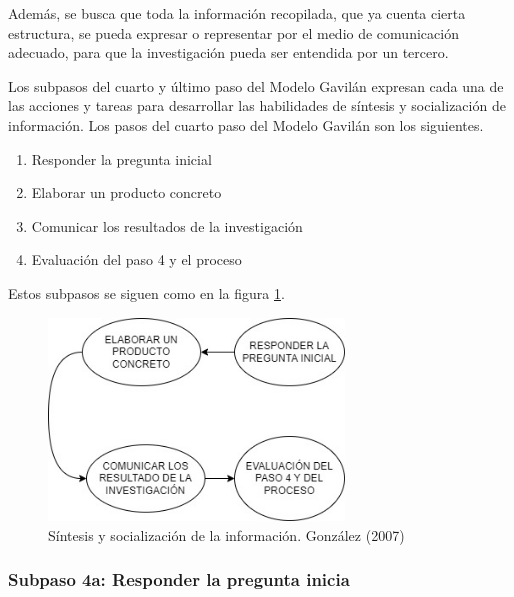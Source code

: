 Además, se busca que toda la información recopilada, que ya cuenta cierta estructura, se pueda expresar o representar por el medio de comunicación adecuado, para que la investigación pueda ser entendida por un tercero.

Los subpasos del cuarto y último paso del Modelo Gavilán expresan cada una de las acciones y tareas para desarrollar las habilidades de síntesis y socialización de información. Los pasos del cuarto paso del Modelo Gavilán son los siguientes.

\begin{enumerate}
  \item Responder la pregunta inicial
  \item Elaborar un producto concreto
  \item Comunicar los resultados de la investigación
  \item Evaluación del paso 4 y el proceso
\end{enumerate}

Estos subpasos se siguen como en la figura \ref{fig:26}.

\begin{figure}
  \centering
  \includegraphics[width=0.70\textwidth]{Cap2/Figuras/Síntesis y socialización de información.jpg}
  \caption{Síntesis y socialización de la información. González (2007)}
  \label{fig:26}
\end{figure}


\subsubsection{Subpaso 4a: Responder la pregunta inicia}
\label{secPaso4aCap2}

